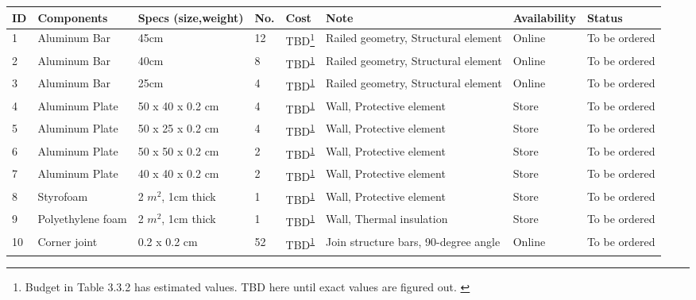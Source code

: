 \begin{longtable}{|m{}|m{}|m{}|m{}|m{}|m{}|m{}|m{}|}
     
   
\hline
\textbf{ID} & \textbf{Components} & \textbf{Specs (size,weight)} & \textbf{No.} & \textbf{Cost} & \textbf{Note} & \textbf{Availability} & \textbf{Status} \\ \hline

1 & Aluminum Bar & 45cm & 12 & TBD\footnote{Budget in Table 3.3.2 has estimated values. TBD here until exact values are figured out. \label{fn:mechcomp1}} & Railed geometry, Structural element & Online & To be ordered \\ \hline
2 & Aluminum Bar & 40cm & 8 & TBD\textsuperscript{\ref{fn:mechcomp1}} & Railed geometry, Structural element & Online & To be ordered \\ \hline
3 & Aluminum Bar & 25cm & 4 & TBD\textsuperscript{\ref{fn:mechcomp1}} & Railed geometry, Structural element & Online & To be ordered \\ \hline
4 & Aluminum Plate & 50 x 40 x 0.2 cm & 4 & TBD\textsuperscript{\ref{fn:mechcomp1}} & Wall, Protective element & Store & To be ordered \\ \hline
5 & Aluminum Plate & 50 x 25 x 0.2 cm & 4 & TBD\textsuperscript{\ref{fn:mechcomp1}} & Wall, Protective element & Store & To be ordered \\ \hline
6 & Aluminum Plate & 50 x 50 x 0.2 cm & 2 & TBD\textsuperscript{\ref{fn:mechcomp1}} & Wall, Protective element & Store & To be ordered \\ \hline
7 & Aluminum Plate & 40 x 40 x 0.2 cm & 2 & TBD\textsuperscript{\ref{fn:mechcomp1}} & Wall, Protective element & Store & To be ordered \\ \hline
8 & Styrofoam & 2 $m^2$, 1cm thick & 1 & TBD\textsuperscript{\ref{fn:mechcomp1}} & Wall, Protective element & Store & To be ordered \\ \hline
9 & Polyethylene foam & 2 $m^2$, 1cm thick & 1 & TBD\textsuperscript{\ref{fn:mechcomp1}} & Wall, Thermal insulation & Store & To be ordered \\ \hline
10 & Corner joint & 0.2 x 0.2 cm & 52 & TBD\textsuperscript{\ref{fn:mechcomp1}} & Join structure bars, 90-degree angle & Online & To be ordered \\ \hline

\end{longtable}

